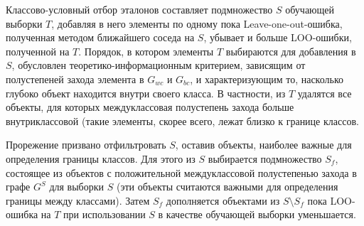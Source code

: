 Классово-условный отбор эталонов составляет подмножество \(S\) обучающей выборки \(T\), добавляя в него элементы по одному пока Leave-one-out-ошибка, полученная методом ближайшего соседа на \(S\), убывает и больше LOO-ошибки, полученной на \(T\). Порядок, в котором элементы \(T\) выбираются для добавления в \(S\), обусловлен теоретико-информационным критерием, зависящим от полустепеней захода элемента в \(G_{wc}\) и \(G_{bc}\), и характеризующим то, насколько глубоко объект находится внутри своего класса. В частности, из \(T\) удалятся все объекты, для которых междуклассовая полустепень захода больше внутриклассовой (такие элементы, скорее всего, лежат близко к границе классов.

Прорежение призвано отфильтровать \(S\), оставив объекты, наиболее важные для определения границы классов. Для этого из \(S\) выбирается подмножество \(S_f\), состоящее из объектов с положительной междуклассовой полустепенью захода в графе \(G^S\) для выборки \(S\) (эти объекты считаются важными для определения границы между классами). Затем \(S_f\) дополняется объектами из \(S\setminus S_f\) пока LOO-ошибка на \(T\) при использовании \(S\) в качестве обучающей выборки уменьшается.

